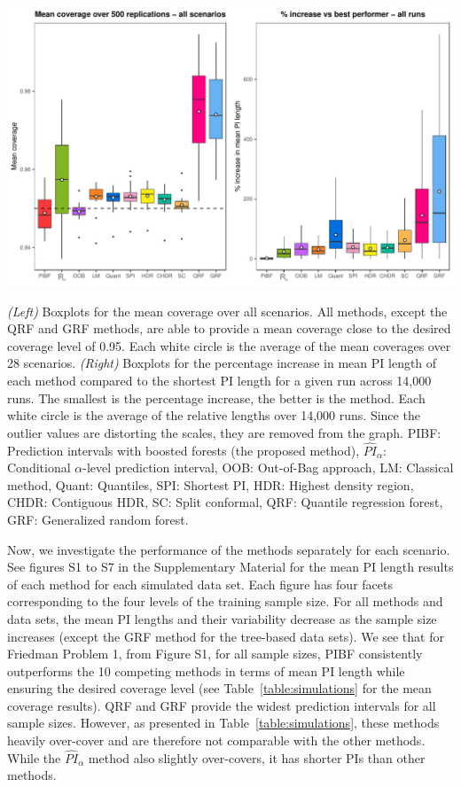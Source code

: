 \begin{widefigure}[htbp]
  \centering
  \includegraphics[scale=0.7]{global_simulated.pdf}
  \caption{\emph{(Left)} Boxplots for the mean coverage over all scenarios. All methods, except the QRF and GRF methods, are able to provide a mean coverage close to the desired coverage level of 0.95. Each white circle is the average of the mean coverages over 28 scenarios. \emph{(Right)} Boxplots for the percentage increase in mean PI length of each method compared to the shortest PI length for a given run across 14,000 runs. The smallest is the percentage increase, the better is the method. Each white circle is the average of the relative lengths over 14,000 runs. Since the outlier values are distorting the scales, they are removed from the graph. PIBF: Prediction intervals with boosted forests (the proposed method), $\widehat{PI}_\alpha$: Conditional $\alpha$-level prediction interval, OOB: Out-of-Bag approach, LM: Classical method, Quant: Quantiles, SPI: Shortest PI, HDR: Highest density region, CHDR: Contiguous HDR, SC: Split conformal, QRF: Quantile regression forest, GRF: Generalized random forest.}
  \label{figure:global}
\end{widefigure}

Now, we investigate the performance of the methods separately for each scenario. See figures S1 to S7 in the Supplementary Material for the mean PI length results of each method for each simulated data set. Each figure has four facets corresponding to the four levels of the training sample size. For all methods and data sets, the mean PI lengths and their variability decrease as the sample size increases (except the GRF method for the tree-based data sets). We see that for Friedman Problem 1, from Figure S1, for all sample sizes, PIBF consistently outperforms the 10 competing methods in terms of mean PI length while ensuring the desired coverage level (see Table~\ref{table:simulations} for the mean coverage results). QRF and GRF provide the widest prediction intervals for all sample sizes. However, as presented in Table~\ref{table:simulations}, these methods heavily over-cover and are therefore not comparable with the other methods. While the $\widehat{PI}_\alpha$ method also slightly over-covers, it has shorter PIs than other methods.

